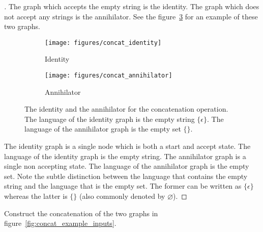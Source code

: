 \begin{proof}[\unskip\nopunct]
The graph which accepts the empty string is the identity. The graph which does
not accept any strings is the annihilator. See the
figure~\ref{fig:concat_identity_annihilator} for an example of these two
graphs.

\begin{figure}
    \centering
    \begin{subfigure}[b]{0.48\textwidth}
        \centering
        \texttt{[image: figures/concat\_identity]}
        \caption{Identity}
        \label{fig:concat_identity}
    \end{subfigure}
    \begin{subfigure}[b]{0.48\textwidth}
        \centering
        \texttt{[image: figures/concat\_annihilator]}
        \caption{Annihilator}
        \label{fig:concat_annihilator}
    \end{subfigure}
    \caption{The identity and the annihilator for the concatenation operation.
    The language of the identity graph is the empty string $\{\epsilon\}$. The
    language of the annihilator graph is the empty set $\{\}$.}
    \label{fig:concat_identity_annihilator}
\end{figure}

The identity graph is a single node which is both a start and accept state. The
language of the identity graph is the empty string. The annihilator graph is a
single non accepting state. The language of the annihilator graph is the empty
set. Note the subtle distinction between the language that contains the empty
string and the language that is the empty set. The former can be written as
$\{\epsilon\}$ whereas the latter is $\{\}$ (also commonly denoted by
$\varnothing$).
\end{proof}

\begin{example}
Construct the concatenation of the two graphs in
figure~\ref{fig:concat_example_inputs}.
\end{example}

